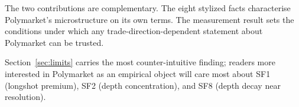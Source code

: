 The two contributions are complementary. The eight stylized facts
characterise Polymarket's microstructure on its own terms. The
measurement result sets the conditions under which any
trade-direction-dependent statement about Polymarket can be trusted.

Section~\ref{sec:limits} carries the most counter-intuitive finding;
readers more interested in Polymarket as an empirical object will
care most about SF1 (longshot premium), SF2 (depth concentration),
and SF8 (depth decay near resolution).
